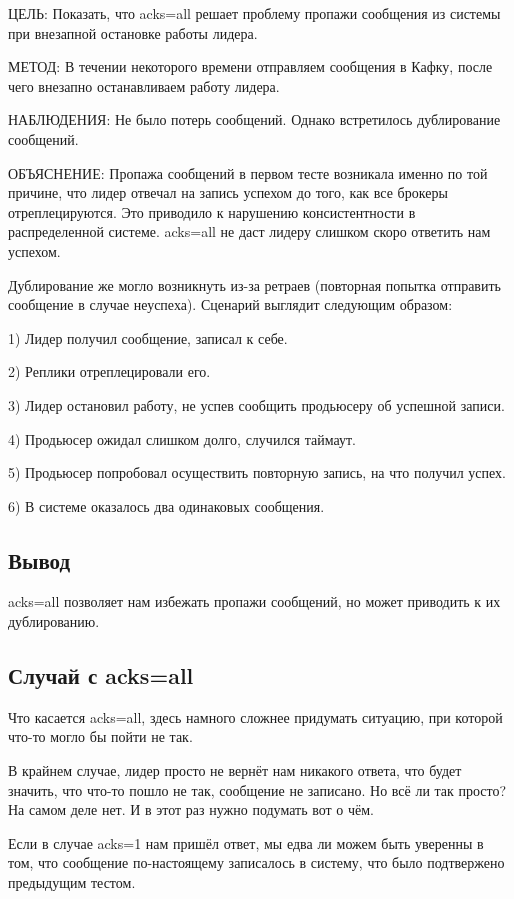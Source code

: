 \documentclass[11pt]{article}
\begin{document}
    ЦЕЛЬ: Показать, что acks=all решает проблему пропажи сообщения из системы при внезапной остановке работы лидера.

    МЕТОД: В течении некоторого времени отправляем сообщения в Кафку, после чего внезапно останавливаем работу лидера.

    НАБЛЮДЕНИЯ: Не было потерь сообщений. Однако встретилось дублирование сообщений.

    ОБЪЯСНЕНИЕ: Пропажа сообщений в первом тесте возникала именно по той причине, что лидер отвечал на запись успехом
    до того, как все брокеры отреплецируются. Это приводило к нарушению консистентности в распределенной системе.
    acks=all не даст лидеру слишком скоро ответить нам успехом.

    Дублирование же могло возникнуть из-за ретраев (повторная попытка отправить сообщение в случае неуспеха).
    Сценарий выглядит следующим образом:

    1) Лидер получил сообщение, записал к себе.

    2) Реплики отреплецировали его.

    3) Лидер остановил работу, не успев сообщить продьюсеру об успешной записи.

    4) Продьюсер ожидал слишком долго, случился таймаут.

    5) Продьюсер попробовал осуществить повторную запись, на что получил успех.

    6) В системе оказалось два одинаковых сообщения.


    \subsection{Вывод}
    acks=all позволяет нам избежать пропажи сообщений, но может приводить к их дублированию.

    \subsection{Случай с acks=all}
    Что касается acks=all, здесь намного сложнее придумать ситуацию, при которой что-то могло бы пойти не так.

    В крайнем случае, лидер просто не вернёт нам никакого ответа, что будет значить, что что-то пошло не так, сообщение не записано. Но всё ли так просто? На самом деле нет. И в этот раз нужно подумать вот о чём.

    Если в случае acks=1 нам пришёл ответ, мы едва ли можем быть уверенны в  том, что сообщение по-настоящему записалось в систему, что было подтвержено предыдущим тестом.
\end{document}
